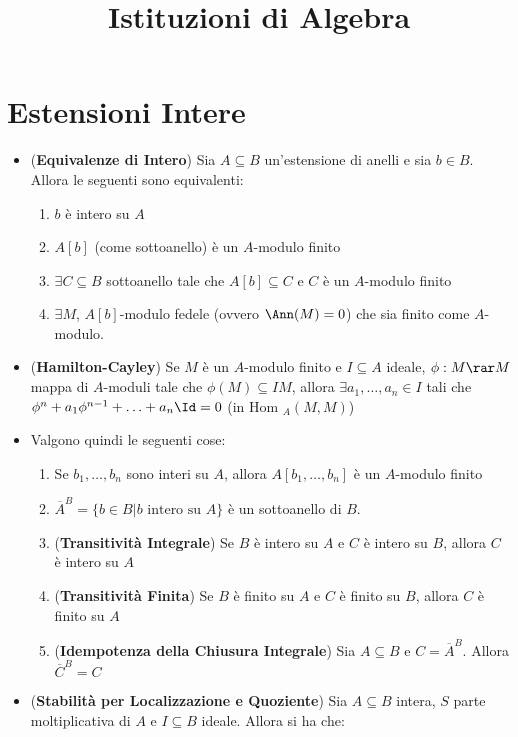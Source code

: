 \documentclass[a4paper,NoNotes,GeneralMath]{stdmdoc}
\newcommand{\Hom}{\text{Hom }}
\newcommand{\intclos}[2]{\ensuremath{\overline{#1}^{#2}}}
\begin{document}
\title{Istituzioni di Algebra}

\section*{Estensioni Intere}
\begin{itemize}
\item ({\bf Equivalenze di Intero}) Sia $A \subseteq B$ un'estensione di
  anelli e sia $b \in B$. Allora le seguenti sono equivalenti:
  \begin{enumerate}
  \item $b$ è intero su $A$
  \item $A[b]$ (come sottoanello) è un $A$-modulo finito
  \item $\exists C \subseteq B$ sottoanello tale che $A[b] \subseteq
    C$ e $C$ è un $A$-modulo finito
  \item $\exists M$, $A[b]$-modulo fedele (ovvero $\Ann(M) = 0$) che
    sia finito come $A$-modulo.
  \end{enumerate}
\item ({\bf Hamilton-Cayley}) Se $M$ è un $A$-modulo finito e
  $I \subseteq A$ ideale, $\phi: M \rar M$ mappa di $A$-moduli tale che
  $\phi(M) \subseteq IM$, allora $\exists a_1, \ldots, a_n \in I$ tali
  che $\phi^n + a_1 \phi^{n-1} + \ldots + a_n \Id = 0$ (in
  $\Hom_A(M, M)$)
\item Valgono quindi le seguenti cose:
  \begin{enumerate}
  \item Se $b_1, \ldots, b_n$ sono interi su $A$, allora
    $A[b_1, \ldots, b_n]$ è un $A$-modulo finito
  \item $\intclos{A}{B} = \{ b \in B | b \text{ intero su } A \}$ è un
    sottoanello di $B$.
  \item ({\bf Transitività Integrale}) Se $B$ è intero su $A$ e $C$ è
    intero su $B$, allora $C$ è intero su $A$
  \item ({\bf Transitività Finita}) Se $B$ è finito su $A$ e $C$ è
    finito su $B$, allora $C$ è finito su $A$
  \item ({\bf Idempotenza della Chiusura Integrale}) Sia $A \subseteq
    B$ e $C = \intclos{A}{B}$. Allora $\intclos{C}{B} = C$
  \end{enumerate}
\item ({\bf Stabilità per Localizzazione e Quoziente}) Sia
  $A \subseteq B$ intera, $S$ parte moltiplicativa di $A$ e
  $I \subseteq B$ ideale. Allora si ha che:
  \begin{enumerate}

\end{enumerate}
\end{itemize}
\end{document}
